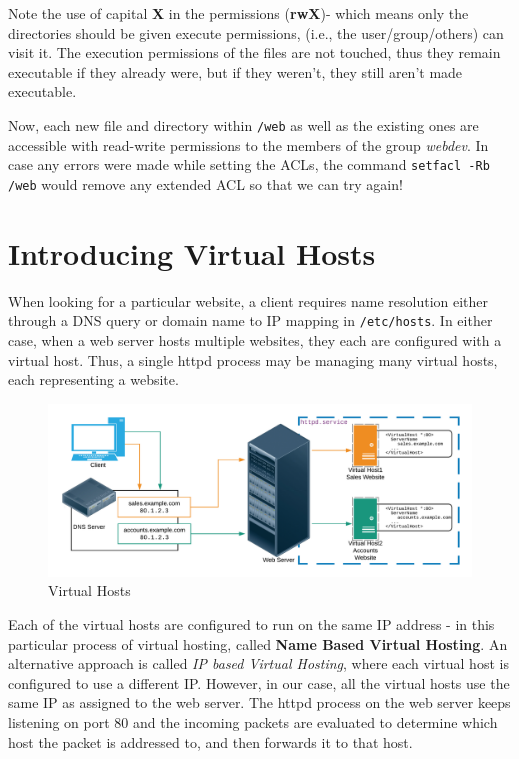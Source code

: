 \noindent
Note the use of capital \textbf{X} in the permissions (\textbf{rwX})- which means only the directories should be given execute permissions, (i.e., the user/group/others) can visit it. The execution permissions of the files are not touched, thus they remain executable if they already were, but if they weren't, they still aren't made executable. 

Now, each new file and directory within \verb|/web| as well as the existing ones are accessible with read-write permissions to the members of the group \textit{webdev}. In case any errors were made while setting the ACLs, the command \verb|setfacl -Rb /web| would remove any extended ACL so that we can try again!

\section{Introducing Virtual Hosts}
When looking for a particular website, a client requires name resolution either through a DNS query or domain name to IP mapping in \verb|/etc/hosts|. In either case, when a web server hosts multiple websites, they each are configured with a virtual host. Thus, a single httpd process may be managing many virtual hosts, each representing a website. 

\begin{figure}[H]
	\centering
	\includegraphics[width=\linewidth]{Mod2/chapters/2.8.a}
	\caption{Virtual Hosts}
	\label{fig:2}
\end{figure}

\noindent
Each of the virtual hosts are configured to run on the same IP address - in this particular process of virtual hosting, called \textbf{Name Based Virtual Hosting}. An alternative approach is called \textit{IP based Virtual Hosting}, where each virtual host is configured to use a different IP. However, in our case, all the virtual hosts use the same IP as assigned to the web server. The httpd process on the web server keeps listening on port 80 and the incoming packets are evaluated to determine which host the packet is addressed to, and then forwards it to that host. 

